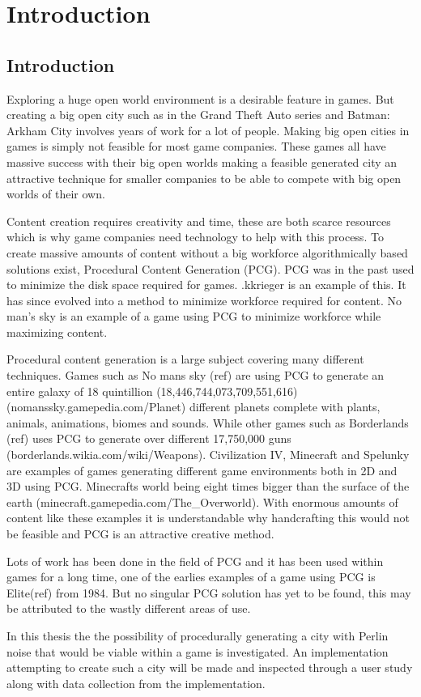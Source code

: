 \section{Introduction}
	\subsection{Introduction}
	Exploring a huge open world environment is a desirable feature in games. But creating a big open city such as in the Grand Theft Auto series and Batman: Arkham City involves years of work for a lot of people. Making big open cities in games is simply not feasible for most game companies. These games all have massive success with their big open worlds making a feasible generated city an attractive technique for smaller companies to be able to compete with big open worlds of their own.
	\par
	Content creation requires creativity and time, these are both scarce resources which is why game companies need technology to help with this process.
	To create massive amounts of content without a big workforce algorithmically based solutions exist, Procedural Content Generation (PCG). PCG was in the past used to minimize the disk space required for games. .kkrieger is an  example of this. It has since evolved into a method to minimize workforce required for content. No man’s sky is an example of a game using PCG to minimize workforce while maximizing content.
	\par
	Procedural content generation is a large subject covering many different techniques. Games such as No mans sky (ref) are using PCG to generate an entire galaxy of 18 quintillion (18,446,744,073,709,551,616) (nomanssky.gamepedia.com/Planet) different planets complete with plants, animals, animations, biomes and sounds. While other games such as Borderlands (ref) uses PCG to generate over different 17,750,000 guns (borderlands.wikia.com/wiki/Weapons). Civilization IV, Minecraft and Spelunky are examples of games generating different game environments both in 2D and 3D using PCG. Minecrafts world being eight times bigger than the surface of the earth (minecraft.gamepedia.com/The\_Overworld). With enormous amounts of content like these examples it is understandable why handcrafting this would not be feasible and PCG is an attractive creative method.
	\par
	Lots of work has been done in the field of PCG and it has been used within games for a long time, one of the earlies examples of a game using PCG is Elite(ref) from 1984. But no singular PCG solution has yet to be found, this may be attributed to the wastly different areas of use.
	\par
	In this thesis the the possibility of procedurally generating a city with Perlin noise that would be viable within a game is investigated. An implementation attempting to create such a city will be made and inspected through a user study along with data collection from the implementation.
	
